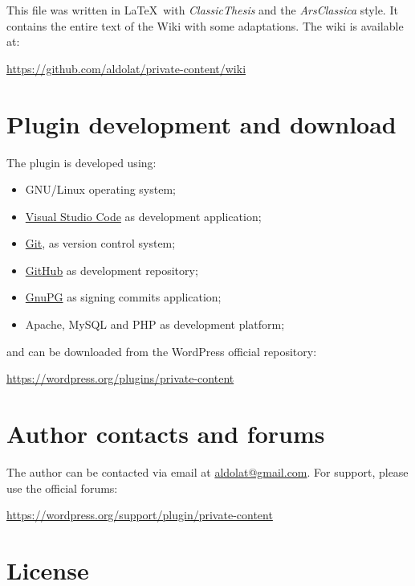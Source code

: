 \begingroup
	\footnotesize

	\noindent This file was written in \LaTeX~with \textit{ClassicThesis} and
	the \textit{ArsClassica} style. It contains the entire text of the Wiki with
	some adaptations. The wiki is available at:

	\begin{center}
		\url{https://github.com/aldolat/private-content/wiki}
	\end{center}

	\section*{Plugin development and download}

	\noindent The plugin is developed using:

	\begin{itemize}
		\item GNU/Linux operating system;
		\item \href{https://code.visualstudio.com}{Visual Studio Code} as development application;
		\item \href{https://git-scm.com}{Git}, as version control system;
		\item \href{https://github.com/aldolat/private-content}{GitHub} as development repository;
		\item \href{https://gnupg.org}{GnuPG} as signing commits application;
		\item Apache, MySQL and PHP as development platform;
	\end{itemize}

	and can be downloaded from the WordPress official repository:
	\begin{center}
	\url{https://wordpress.org/plugins/private-content}
	\end{center}

	\section*{Author contacts and forums}

	\noindent The author can be contacted via email at
	\href{mailto:aldolat@gmail.com}{aldolat@gmail.com}. For support, please use the
	official forums:
	\begin{center}
	\url{https://wordpress.org/support/plugin/private-content}
	\end{center}

	\section*{License}

